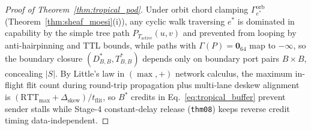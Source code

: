 \documentclass[10pt,twocolumn]{article}
\theoremstyle{spectralthm}
\begin{document}
\begin{proof}[Proof of Theorem~\ref{thm:tropical_pod}]
Under orbit chord clamping $\Gamma_{e^*}^{\mathrm{orb}}$ (Theorem~\ref{thm:sheaf_moesi}(i)), any cyclic walk traversing $e^*$ is dominated in capability by the simple tree path $P_{T_{\mathrm{active}}}(u,v)$ and prevented from looping by anti-hairpinning and TTL bounds, while paths with $\Gamma(P) = \mathbf{0}_{64}$ map to $-\infty$, so the boundary closure $(D_{B,B}^*, T_{B,B}^*)$ depends only on boundary port pairs $B \times B$, concealing $|S|$. By Little's law in $(\max,+)$ network calculus, the maximum in-flight flit count during round-trip propagation plus multi-lane deskew alignment is $(\mathrm{RTT}_{\max} + \Delta_{\mathrm{skew}})/t_{\mathrm{flit}}$, so $B^*$ credits in Eq.~\eqref{eq:tropical_buffer} prevent sender stalls while Stage-4 constant-delay release (\texttt{thm08}) keeps reverse credit timing data-independent.
\end{proof}
\end{document}
